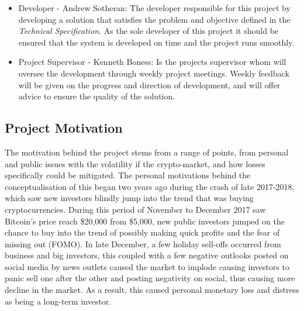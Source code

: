 \documentclass[oneside, 12pt]{article}
\begin{document}
\begin{itemize}
			\item Developer - Andrew Sotheran: The developer responsible for this project by developing a solution that satisfies the problem and	objective defined in the \textit{Technical Specification}. As the sole developer of this project it should be ensured that the system is developed on time and the project runs smoothly.
			\item Project Supervisor - Kenneth Boness: Is the projects supervisor whom will oversee the development through weekly project meetings. Weekly feedback will be given on the progress and direction of development, and will offer advice to ensure the quality of the solution.
		\end{itemize}
		\newpage
		
		\subsection{Project Motivation}
		The motivation behind the project stems from a range of points, from personal and public issues with the volatility if the crypto-market, and how losses specifically could be mitigated. The personal motivations behind the conceptualisation of this began two years ago during the crash of late 2017-2018, which saw new investors blindly jump into the trend that was buying cryptocurrencies. During this period of November to December 2017 saw Bitcoin's price reach \$20,000 from \$5,000, new public investors jumped on the chance to buy into the trend of possibly making quick profits and the fear of missing out (FOMO). In late December, a few holiday sell-offs occurred from business and big investors, this coupled with a few negative outlooks posted on social media by news outlets caused the market to implode causing investors to panic sell one after the other and posting negativity on social, thus causing more decline in the market. As a result, this caused personal monetary loss and distress as being a long-term investor.
		
\end{document}
